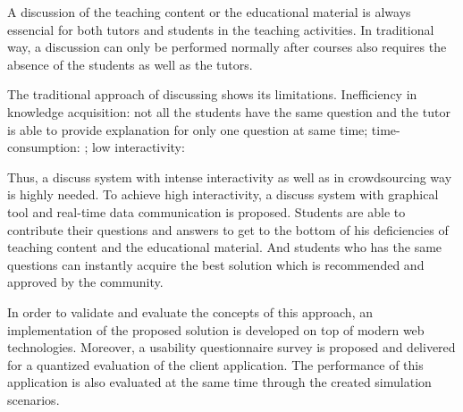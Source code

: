 A discussion of the teaching content or the educational material is always essencial for both tutors and students in the teaching activities. In traditional way, a discussion can only be performed normally after courses also requires the absence of the students as well as the tutors.

The traditional approach of discussing shows its limitations. Inefficiency in knowledge acquisition: not all the students have the same question and the tutor is able to provide explanation for only one question at same time; time-consumption: ; low interactivity:

Thus, a discuss system with intense interactivity as well as in crowdsourcing way is highly needed. To achieve high interactivity, a discuss system with graphical tool and real-time data communication is proposed. Students are able to contribute their questions and answers to get to the bottom of his deficiencies of teaching content and the educational material. And students who has the same questions can instantly acquire the best solution  which is recommended and approved by the community.

In order to validate and evaluate the concepts of this approach, an implementation of the proposed solution is developed on top of modern web technologies. Moreover, a usability questionnaire survey is proposed and delivered for a quantized evaluation of the client application. The performance of this application is also evaluated at the same time through the created simulation scenarios.
